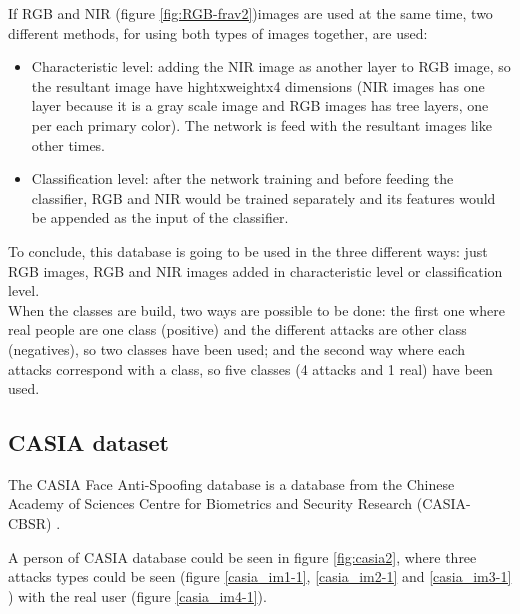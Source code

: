 If RGB and NIR (figure \ref{fig:RGB-frav2})images are used at the same time, two different methods, for using both types of images together, are used:
\begin{itemize}
\item Characteristic level: adding the NIR image as another layer to RGB image, so the resultant image have hightxweightx4 dimensions (NIR images has one layer because it is a gray scale image and RGB images has tree layers, one per each primary color). The network is feed with the resultant images like other times.
\item Classification level: after the network training and before feeding the classifier, RGB and NIR would be trained separately and its features would be appended as the input of the classifier.
\end{itemize}

To conclude, this database is going to be used in the three different ways: just RGB images, RGB and NIR images added in characteristic level or classification level.\\

When the classes are build, two ways are possible to be done: the first one where real people are one class (positive) and the different attacks are other class (negatives), so two classes have been used; and the second way where each attacks correspond with a class, so five classes (4 attacks and 1 real) have been used.\\


\subsection{CASIA dataset}
The CASIA Face Anti-Spoofing database is a database from the Chinese Academy of Sciences Centre for Biometrics and Security Research (CASIA-CBSR) \cite{Casiadatbase}.

A person of CASIA database could be seen in figure \ref{fig:casia2}, where three attacks types could be seen (figure \ref{casia_im1-1}, \ref{casia_im2-1} and \ref{casia_im3-1} ) with the real user (figure \ref{casia_im4-1}). \\

